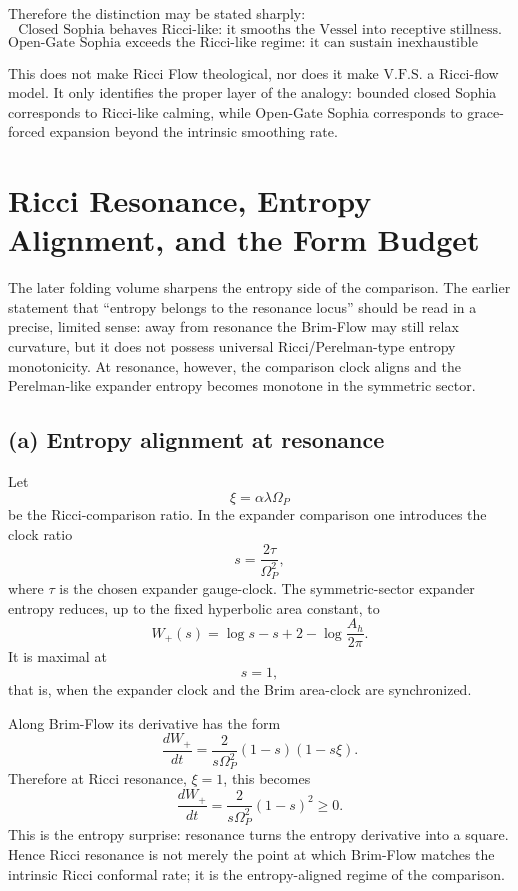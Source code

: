 \documentclass[11pt]{article}
\newcommand{\VFS}{\ensuremath{\mathrm{V.F.S.}}}
\begin{document}
Therefore the distinction may be stated sharply:
\[
 \text{Closed Sophia behaves Ricci-like: it smooths the Vessel into receptive stillness.}
\]
\[
 \text{Open-Gate Sophia exceeds the Ricci-like regime: it can sustain inexhaustible expansion.}
\]

This does not make Ricci Flow theological, nor does it make \VFS{} a Ricci-flow model. It only identifies the proper layer of the analogy: bounded closed Sophia corresponds to Ricci-like calming, while Open-Gate Sophia corresponds to grace-forced expansion beyond the intrinsic smoothing rate.


\section{Ricci Resonance, Entropy Alignment, and the Form Budget}

The later folding volume sharpens the entropy side of the comparison. The earlier statement that ``entropy belongs to the resonance locus'' should be read in a precise, limited sense: away from resonance the Brim-Flow may still relax curvature, but it does not possess universal Ricci/Perelman-type entropy monotonicity. At resonance, however, the comparison clock aligns and the Perelman-like expander entropy becomes monotone in the symmetric sector.

\subsection*{(a) Entropy alignment at resonance}

Let
\[
 \xi=\alpha\lambda\Omega_P
\]
be the Ricci-comparison ratio. In the expander comparison one introduces the clock ratio
\[
 s=\frac{2\tau}{\Omega_P^2},
\]
where \(\tau\) is the chosen expander gauge-clock. The symmetric-sector expander entropy reduces, up to the fixed hyperbolic area constant, to
\[
 W_+(s)=\log s-s+2-\log\frac{A_h}{2\pi}.
\]
It is maximal at
\[
 s=1,
\]
that is, when the expander clock and the Brim area-clock are synchronized.

Along Brim-Flow its derivative has the form
\[
 \frac{dW_+}{dt}
 =
 \frac{2}{s\Omega_P^2}(1-s)(1-s\xi).
\]
Therefore at Ricci resonance, \(\xi=1\), this becomes
\[
 \frac{dW_+}{dt}
 =
 \frac{2}{s\Omega_P^2}(1-s)^2
 \ge0.
\]
This is the entropy surprise: resonance turns the entropy derivative into a square. Hence Ricci resonance is not merely the point at which Brim-Flow matches the intrinsic Ricci conformal rate; it is the entropy-aligned regime of the comparison.
\end{document}

